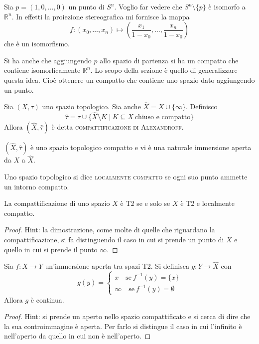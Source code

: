 \begin{ex}
    Sia $p=(1,0,\dots,0)$ un punto di $S^n$. Voglio far vedere che $S^n\setminus\{p\}$ \`e isomorfo a $\mathbb{R}^n$. In effetti la proiezione stereografica mi fornisce la mappa
    \[
        f\colon(x_0, \dots, x_n)\mapsto\left(\frac{x_1}{1-x_0}, \dots, \frac{x_n}{1-x_0}\right)
    \]
    che \`e un isomorfismo.

    Si ha anche che aggiungendo $p$ allo spazio di partenza si ha un compatto che contiene isomorficamente $\mathbb{R}^n$. Lo scopo della sezione \`e quello di generalizzare questa idea. Cio\`e ottenere un compatto che contiene uno spazio dato aggiungendo un punto.
\end{ex}

\begin{defn}
    Sia $(X,\tau)$ uno spazio topologico. Sia anche $\hat{X} = X \cup \{\infty\}$. Definisco
    \[
        \hat{\tau} = \tau \cup \{\hat{X}\setminus K\; |\ K \subseteq X\  \text{chiuso e compatto}\}
    \]
    Allora $(\hat{X}, \hat{\tau})$ \`e detta \textsc{compattificazione di Alexandroff}.
\end{defn}

\begin{oss}
    $(\hat{X}, \hat{\tau})$ \`e uno spazio topologico compatto e vi \`e una naturale immersione aperta da $X$ a $\hat{X}$.
\end{oss}

\begin{defn}
    Uno spazio topologico si dice \textsc{localmente compatto} se ogni suo punto ammette un intorno compatto.
\end{defn}

\begin{prop}
    La compattificazione di uno spazio $X$ \`e T2 se e solo se $X$ \`e T2 e localmente compatto.
\end{prop}
\begin{proof}
    Hint: la dimostrazione, come molte di quelle che riguardano la compattificazione, si fa distinguendo il caso in cui si prende un punto di $X$ e quello in cui si prende il punto $\infty$.
\end{proof}

\begin{prop}
    Sia $f\colon X \longrightarrow Y$ un'immersione aperta tra spazi T2. Si definisca $g\colon Y \longrightarrow \hat{X}$ con
    \[
        g(y) =
        \begin{cases}
            x\quad \text{se}\ f^{-1}(y) = \{x\}\\
            \infty \quad\text{se}\ f^{-1}(y) = \emptyset
        \end{cases}
    \]
    Allora $g$ \`e continua.
\end{prop}
\begin{proof}
    Hint: si prende un aperto nello spazio compattificato e si cerca di dire che la sua controimmagine \`e aperta. Per farlo si distingue il caso in cui l'infinito \`e nell'aperto da quello in cui non \`e nell'aperto.
\end{proof}

